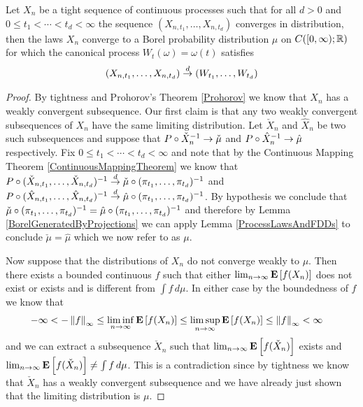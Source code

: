 \begin{thm}\label{ConvergenceInDistributionOfContinuousAsTightnessAndFDDs}Let $X_n$ be a tight sequence of continuous processes such
  that for all $d > 0$ and $0 \leq t_1 < \dotsb < t_d < \infty$ the
  sequence $(X_{n, t_1}, \dotsc , X_{n, t_d})$ converges in
  distribution, then the laws $X_n$ converge to a Borel probability
  distribution $\mu$ on $C([0,\infty); \reals)$ for which the
  canonical process $W_t(\omega) = \omega(t)$ satisfies
\begin{align*}
(X_{n, t_1}, \dotsc , X_{n, t_d}) \todist (W_{t_1}, \dotsc, W_{t_d})
\end{align*}
\end{thm}
\begin{proof}
By tightness and Prohorov's Theorem \ref{Prohorov} we know that $X_n$
has a weakly convergent subsequence.  Our first claim is that any two weakly convergent subsequences of
$X_n$ have the same limiting distribution.  Let $\check{X}_n$ and $\hat{X}_n$ be two
such subsequences and suppose that $\pushforward{\check{X}_n}{P} \to
\check{\mu}$ and $\pushforward{\hat{X}_n}{P} \to\hat{\mu}$
respectively.  Fix $0 \leq t_1 < \dotsb < t_d < \infty$ and note that
by the Continuous Mapping Theorem \ref{ContinuousMappingTheorem} we
know that $\pushforward{(\check{X}_{n,t_1}, \dotsc,
  \check{X}_{n,t_d})}{P} \todist \pushforward{(\pi_{t_1}, \dotsc,
  \pi_{t_d})}{\check{\mu}}$ and $\pushforward{(\hat{X}_{n,t_1}, \dotsc,
  \hat{X}_{n,t_d})}{P} \todist \pushforward{(\pi_{t_1}, \dotsc,
  \pi_{t_d})}{\hat{\mu}}$.  By hypothesis we conclude that $\pushforward{(\pi_{t_1}, \dotsc,
  \pi_{t_d})}{\check{\mu}} = \pushforward{(\pi_{t_1}, \dotsc,
  \pi_{t_d})}{\hat{\mu}}$ and therefore by
Lemma \ref{BorelGeneratedByProjections} we can apply Lemma
\ref{ProcessLawsAndFDDs} to conclude $\check{\mu}=\hat{\mu}$ which we
now refer to as $\mu$.

Now suppose that the distributions of $X_n$ do not converge weakly to
$\mu$.  Then there exists a bounded continuous $f$ such that either
$\lim_{n \to \infty} \expectation{f(X_n)}$ does not exist or exists
and is different from $\int f \, d\mu$.  In either case by the
boundedness of $f$ we know that 
\begin{align*}
-\infty &< -\norm{f}_\infty \leq \liminf_{n \to \infty}
\expectation{f(X_n)} \leq \limsup_{n \to \infty} \expectation{f(X_n)}
\leq \norm{f}_\infty  < \infty
\end{align*}
and we can extract
a subsequence $\check{X}_n$ such that $\lim_{n \to \infty}
\expectation{f(\check{X}_n)}$ exists and $\lim_{n \to \infty}
\expectation{f(\check{X}_n)} \neq \int f \, d\mu$.  This is a
contradiction since by tightness we know that $\check{X}_n$ has a weakly
convergent subsequence and we have already just shown that the limiting
distribution is $\mu$.
\end{proof}

